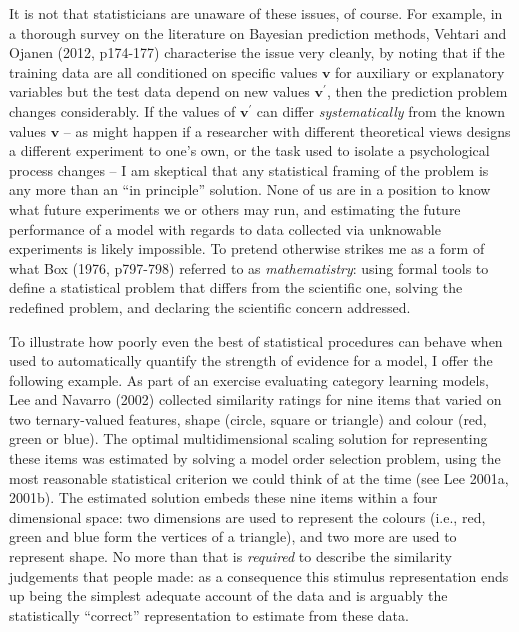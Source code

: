 \documentclass[doc]{apa6}
\theoremstyle{definition}
\theoremstyle{definition}
\theoremstyle{definition}
\theoremstyle{remark}
\begin{document}
It is not that statisticians are unaware of these issues, of course. For
example, in a thorough survey on the literature on Bayesian prediction
methods, Vehtari and Ojanen (2012, p174-177) characterise the issue very
cleanly, by noting that if the training data are all conditioned on
specific values \(\bm{v}\) for auxiliary or explanatory variables but
the test data depend on new values \(\bm{v}^\prime\), then the
prediction problem changes considerably. If the values of
\(\bm{v}^\prime\) can differ \emph{systematically} from the known values
\(\bm{v}\) -- as might happen if a researcher with different theoretical
views designs a different experiment to one's own, or the task used to
isolate a psychological process changes -- I am skeptical that any
statistical framing of the problem is any more than an \enquote{in
principle} solution. None of us are in a position to know what future
experiments we or others may run, and estimating the future performance
of a model with regards to data collected via unknowable experiments is
likely impossible. To pretend otherwise strikes me as a form of what Box
(1976, p797-798) referred to as \emph{mathematistry}: using formal tools
to define a statistical problem that differs from the scientific one,
solving the redefined problem, and declaring the scientific concern
addressed.

To illustrate how poorly even the best of statistical procedures can
behave when used to automatically quantify the strength of evidence for
a model, I offer the following example. As part of an exercise
evaluating category learning models, Lee and Navarro (2002) collected
similarity ratings for nine items that varied on two ternary-valued
features, shape (circle, square or triangle) and colour (red, green or
blue). The optimal multidimensional scaling solution for representing
these items was estimated by solving a model order selection problem,
using the most reasonable statistical criterion we could think of at the
time (see Lee 2001a, 2001b). The estimated solution embeds these nine
items within a four dimensional space: two dimensions are used to
represent the colours (i.e., red, green and blue form the vertices of a
triangle), and two more are used to represent shape. No more than that
is \emph{required} to describe the similarity judgements that people
made: as a consequence this stimulus representation ends up being the
simplest adequate account of the data and is arguably the statistically
\enquote{correct} representation to estimate from these data.
\end{document}
